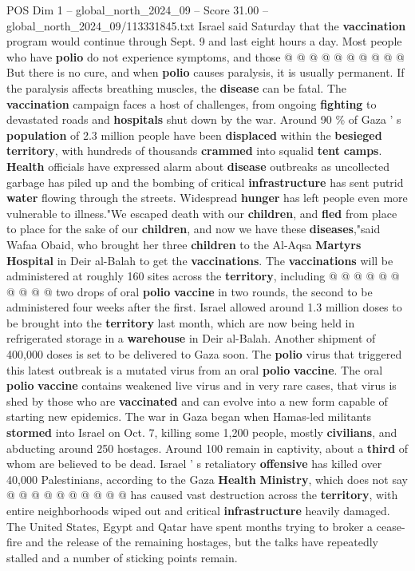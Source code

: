 \begin{textsample}{POS Dim 1 – global\_north\_2024\_09 – Score 31.00 – global\_north\_2024\_09/113331845.txt}
Israel said Saturday that the \textbf{vaccination} program would continue through Sept. 9 and last eight hours a day.
Most people who have \textbf{polio} do not experience symptoms, and those @ @ @ @ @ @ @ @ @ @ But there is no cure, and when \textbf{polio} causes paralysis, it is usually permanent.
If the paralysis affects breathing muscles, the \textbf{disease} can be fatal.
The \textbf{vaccination} campaign faces a host of challenges, from ongoing \textbf{fighting} to devastated roads and \textbf{hospitals} shut down by the war.
Around 90 \% of Gaza ' s \textbf{population} of 2.3 million people have been \textbf{displaced} within the \textbf{besieged} \textbf{territory}, with hundreds of thousands \textbf{crammed} into squalid \textbf{tent} \textbf{camps}. \textbf{Health} officials have expressed alarm about \textbf{disease} outbreaks as uncollected garbage has piled up and the bombing of critical \textbf{infrastructure} has sent putrid \textbf{water} flowing through the streets.
Widespread \textbf{hunger} has left people even more vulnerable to illness."We escaped death with our \textbf{children}, and \textbf{fled} from place to place for the sake of our \textbf{children}, and now we have these \textbf{diseases},"said Wafaa Obaid, who brought her three \textbf{children} to the Al-Aqsa \textbf{Martyrs} \textbf{Hospital} in Deir al-Balah to get the \textbf{vaccinations}.
The \textbf{vaccinations} will be administered at roughly 160 sites across the \textbf{territory}, including @ @ @ @ @ @ @ @ @ @ two drops of oral \textbf{polio} \textbf{vaccine} in two rounds, the second to be administered four weeks after the first.
Israel allowed around 1.3 million doses to be brought into the \textbf{territory} last month, which are now being held in refrigerated storage in a \textbf{warehouse} in Deir al-Balah.
Another shipment of 400,000 doses is set to be delivered to Gaza soon.
The \textbf{polio} virus that triggered this latest outbreak is a mutated virus from an oral \textbf{polio} \textbf{vaccine}.
The oral \textbf{polio} \textbf{vaccine} contains weakened live virus and in very rare cases, that virus is shed by those who are \textbf{vaccinated} and can evolve into a new form capable of starting new epidemics.
The war in Gaza began when Hamas-led militants \textbf{stormed} into Israel on Oct. 7, killing some 1,200 people, mostly \textbf{civilians}, and abducting around 250 hostages.
Around 100 remain in captivity, about a \textbf{third} of whom are believed to be dead.
Israel ' s retaliatory \textbf{offensive} has killed over 40,000 Palestinians, according to the Gaza \textbf{Health} \textbf{Ministry}, which does not say @ @ @ @ @ @ @ @ @ @ has caused vast destruction across the \textbf{territory}, with entire neighborhoods wiped out and critical \textbf{infrastructure} heavily damaged.
The United States, Egypt and Qatar have spent months trying to broker a cease-fire and the release of the remaining hostages, but the talks have repeatedly stalled and a number of sticking points remain.


\end{textsample}
